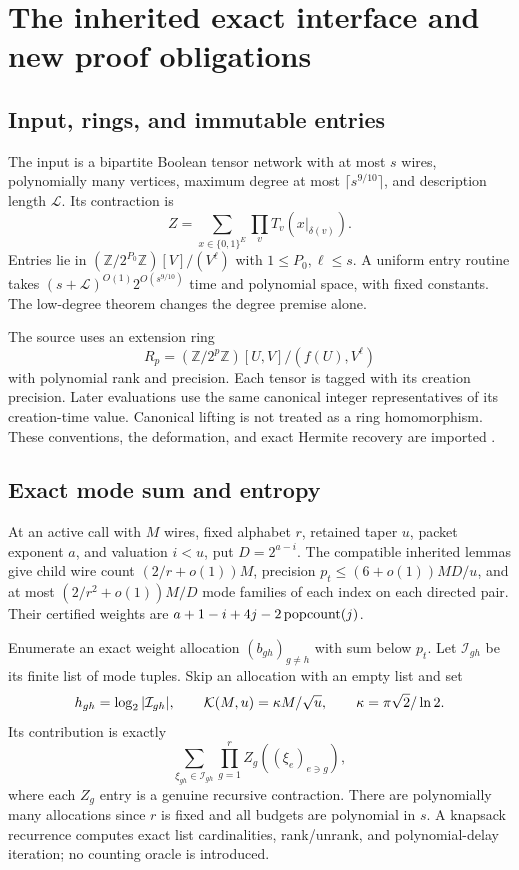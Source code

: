 \section{The inherited exact interface and new proof obligations}
\label{sec:interface}

\subsection{Input, rings, and immutable entries}

The input is a bipartite Boolean tensor network with at most $s$ wires,
polynomially many vertices, maximum degree at most $\lceil s^{9/10}\rceil$,
and description length $\mathcal L$. Its contraction is
\[
 Z=\sum_{x\in\{0,1\}^{E}}\prod_v T_v(x|_{\delta(v)}).
\]
Entries lie in $(\mathbb Z/2^{P_0}\mathbb Z)[V]/(V^\ell)$ with
$1\le P_0,\ell\le s$. A uniform entry routine takes
$(s+\mathcal L)^{O(1)}2^{O(s^{9/10})}$ time and polynomial space, with
fixed constants. The low-degree theorem changes the degree premise alone.

The source uses an extension ring
\[
 R_p=(\mathbb Z/2^p\mathbb Z)[U,V]/(f(U),V^\ell)
\]
with polynomial rank and precision. Each tensor is tagged with its creation
precision. Later evaluations use the same canonical integer representatives
of its creation-time value. Canonical lifting is not treated as a ring
homomorphism. These conventions, the deformation, and exact Hermite recovery
are imported \cite{source,asymmetric,joint,flags,trees}.

\subsection{Exact mode sum and entropy}

At an active call with $M$ wires, fixed alphabet $r$, retained taper $u$,
packet exponent $a$, and valuation $i<u$, put $D=2^{a-i}$. The compatible
inherited lemmas give child wire count $(2/r+o(1))M$, precision
$p_t\le(6+o(1))MD/u$, and at most $(2/r^2+o(1))M/D$ mode families of
each index on each directed pair. Their certified weights are
$a+1-i+4j-2\operatorname{popcount}(j)$.

Enumerate an exact weight allocation $(b_{gh})_{g\ne h}$ with sum below
$p_t$. Let $\mathcal I_{gh}$ be its finite list of mode tuples. Skip an
allocation with an empty list and set
\[
 h_{gh}=\log_2|\mathcal I_{gh}|,\qquad
 \mathcal K(M,u)=\kappa M/\sqrt u,\qquad\kappa=\pi\sqrt2/\ln2.
\]
Its contribution is exactly
\begin{equation}\label{eq:exact-sum}
 \sum_{\xi_{gh}\in\mathcal I_{gh}}
       \prod_{g=1}^r Z_g((\xi_e)_{e\ni g}),
\end{equation}
where each $Z_g$ entry is a genuine recursive contraction. There are
polynomially many allocations since $r$ is fixed and all budgets are
polynomial in $s$. A knapsack recurrence computes exact list cardinalities,
rank/unrank, and polynomial-delay iteration; no counting oracle is introduced.

